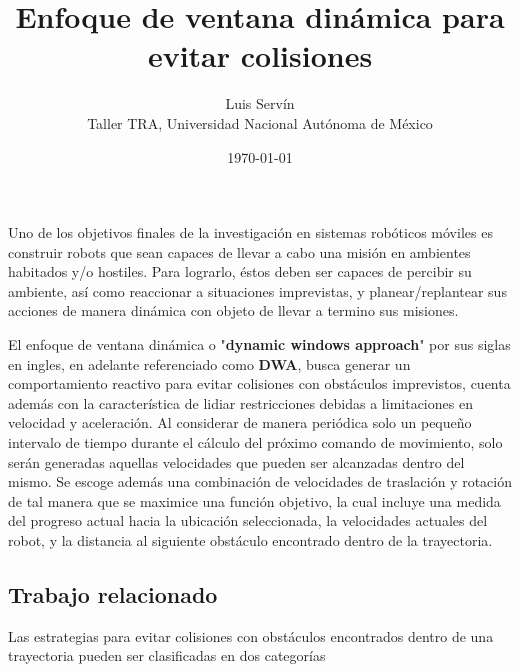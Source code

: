 \documentclass[10pt]{article}
\title{\vspace{-4ex}\textbf{Enfoque de ventana dinámica para evitar colisiones}\vspace{-2ex}}
\date{\today}
\author{Luis Servín\\ Taller TRA, Universidad Nacional Autónoma de México}
\begin{document}
\maketitle

Uno de los objetivos finales de la investigación en sistemas robóticos móviles es construir robots que sean capaces de llevar a cabo una misión en ambientes habitados y/o hostiles. Para lograrlo, éstos deben ser capaces de percibir su ambiente, así como reaccionar a situaciones imprevistas, y planear/replantear sus acciones de manera dinámica con objeto de llevar a termino sus misiones.

El enfoque de ventana dinámica o "\textbf{dynamic windows approach}" por sus siglas en ingles, en adelante referenciado como \textbf{DWA}, busca generar un comportamiento reactivo para evitar colisiones con obstáculos imprevistos, cuenta además con la característica de lidiar restricciones debidas a limitaciones en velocidad y aceleración. Al considerar de manera periódica solo un pequeño intervalo de tiempo durante el cálculo del próximo comando de movimiento, solo serán generadas aquellas velocidades que pueden ser alcanzadas dentro del mismo. Se escoge además una combinación de velocidades de traslación y rotación de tal manera que se maximice una función objetivo, la cual incluye una medida del progreso actual hacia la ubicación seleccionada, la velocidades actuales del robot, y la distancia al siguiente obstáculo encontrado dentro de la trayectoria.

\subsection*{Trabajo relacionado}

Las estrategias para evitar colisiones con obstáculos encontrados dentro de una trayectoria pueden ser clasificadas en dos categorías
\end{document}
